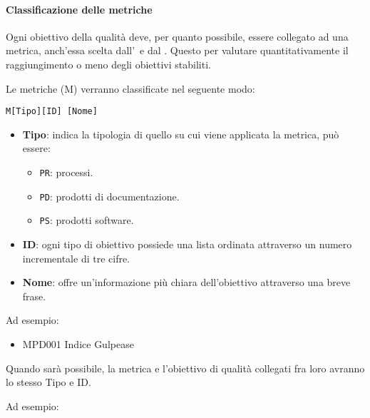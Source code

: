         \paragraph{Classificazione delle metriche}\label{Classificazione metriche}
        Ogni obiettivo della qualità deve, per quanto possibile, essere collegato ad una metrica, anch'essa scelta dall'\Amm\ e dal \Ver. Questo per valutare
        quantitativamente il raggiungimento o meno degli obiettivi stabiliti.

        Le metriche (M) verranno classificate nel seguente modo:

        \begin{center}
            \texttt{M[Tipo][ID] [Nome]}
        \end{center}

        \begin{itemize}
            \item \textbf{Tipo}: indica la tipologia di quello su cui viene applicata la metrica, può essere:
            \begin{itemize}
                \item \texttt{PR}: processi.
                \item \texttt{PD}: prodotti di documentazione.
                \item \texttt{PS}: prodotti software.
            \end{itemize}

            \item \textbf{ID}: ogni tipo di obiettivo possiede una lista ordinata attraverso un numero incrementale di tre cifre.
            \item \textbf{Nome}: offre un'informazione più chiara dell'obiettivo attraverso una breve frase.
        \end{itemize}

        Ad esempio:

        \begin{itemize}
            \item MPD001 Indice Gulpease
        \end{itemize}

        Quando sarà possibile, la metrica e l'obiettivo di qualità collegati fra loro avranno lo stesso Tipo e ID.

        Ad esempio:

